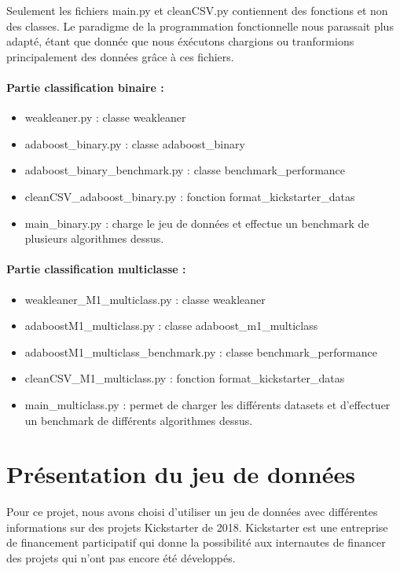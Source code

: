 \documentclass{article}
\begin{document}
Seulement les fichiers main.py et cleanCSV.py contiennent des fonctions et non des classes. Le paradigme de la programmation fonctionnelle nous parassait plus adapté, étant que donnée que nous éxécutons chargions ou tranformions principalement des données grâce à ces fichiers.  

\paragraph{Partie classification binaire : }
\begin{itemize}
  \item weakleaner.py : classe weakleaner
  \item adaboost\_binary.py : classe adaboost\_binary
  \item adaboost\_binary\_benchmark.py : classe benchmark\_performance
  \item cleanCSV\_adaboost\_binary.py : fonction format\_kickstarter\_datas
  \item main\_binary.py : charge le jeu de données et effectue un benchmark de plusieurs algorithmes dessus.
\end{itemize}

\paragraph{Partie classification multiclasse : }


\begin{itemize}
  \item weakleaner\_M1\_multiclass.py : classe weakleaner
  \item adaboostM1\_multiclass.py : classe adaboost\_m1\_multiclass
  \item adaboostM1\_multiclass\_benchmark.py : classe benchmark\_performance
  \item cleanCSV\_M1\_multiclass.py : fonction format\_kickstarter\_datas
  \item main\_multiclass.py : permet de charger les différents datasets et d'effectuer un benchmark de différents algorithmes dessus. 
\end{itemize}


\section{Présentation du jeu de données}

Pour ce projet, nous avons choisi d'utiliser un jeu de données avec différentes informations sur des projets Kickstarter de 2018. Kickstarter est une entreprise de financement participatif qui donne la possibilité aux internautes de financer des projets qui n'ont pas encore été développés.\newline 
\end{document}
